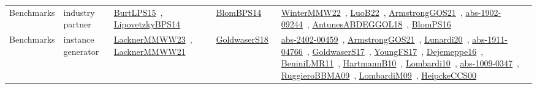 {\begin{longtable}{lp{3cm}>{\raggedright\arraybackslash}p{6cm}>{\raggedright\arraybackslash}p{6cm}>{\raggedright\arraybackslash}p{8cm}}
Benchmarks & industry partner & \href{works/BurtLPS15.pdf}{BurtLPS15}~\cite{BurtLPS15}, \href{works/LipovetzkyBPS14.pdf}{LipovetzkyBPS14}~\cite{LipovetzkyBPS14} & \href{works/BlomBPS14.pdf}{BlomBPS14}~\cite{BlomBPS14} & \href{works/WinterMMW22.pdf}{WinterMMW22}~\cite{WinterMMW22}, \href{works/LuoB22.pdf}{LuoB22}~\cite{LuoB22}, \href{works/ArmstrongGOS21.pdf}{ArmstrongGOS21}~\cite{ArmstrongGOS21}, \href{works/abs-1902-09244.pdf}{abs-1902-09244}~\cite{abs-1902-09244}, \href{works/AntunesABDEGGOL18.pdf}{AntunesABDEGGOL18}~\cite{AntunesABDEGGOL18}, \href{works/BlomPS16.pdf}{BlomPS16}~\cite{BlomPS16}\\
Benchmarks & instance generator & \href{works/LacknerMMWW23.pdf}{LacknerMMWW23}~\cite{LacknerMMWW23}, \href{works/LacknerMMWW21.pdf}{LacknerMMWW21}~\cite{LacknerMMWW21} & \href{works/GoldwaserS18.pdf}{GoldwaserS18}~\cite{GoldwaserS18} & \href{works/abs-2402-00459.pdf}{abs-2402-00459}~\cite{abs-2402-00459}, \href{works/ArmstrongGOS21.pdf}{ArmstrongGOS21}~\cite{ArmstrongGOS21}, \href{works/Lunardi20.pdf}{Lunardi20}~\cite{Lunardi20}, \href{works/abs-1911-04766.pdf}{abs-1911-04766}~\cite{abs-1911-04766}, \href{works/GoldwaserS17.pdf}{GoldwaserS17}~\cite{GoldwaserS17}, \href{works/YoungFS17.pdf}{YoungFS17}~\cite{YoungFS17}, \href{works/Dejemeppe16.pdf}{Dejemeppe16}~\cite{Dejemeppe16}, \href{works/BeniniLMR11.pdf}{BeniniLMR11}~\cite{BeniniLMR11}, \href{works/HartmannB10.pdf}{HartmannB10}~\cite{HartmannB10}, \href{works/Lombardi10.pdf}{Lombardi10}~\cite{Lombardi10}, \href{works/abs-1009-0347.pdf}{abs-1009-0347}~\cite{abs-1009-0347}, \href{works/RuggieroBBMA09.pdf}{RuggieroBBMA09}~\cite{RuggieroBBMA09}, \href{works/LombardiM09.pdf}{LombardiM09}~\cite{LombardiM09}, \href{works/HeipckeCCS00.pdf}{HeipckeCCS00}~\cite{HeipckeCCS00}\\

\end{longtable}}
